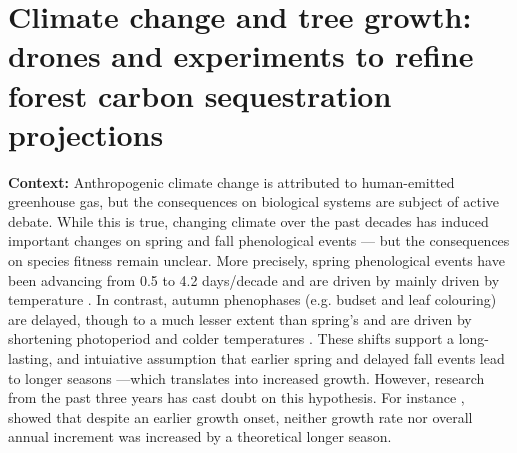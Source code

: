 \documentclass[12pt]{article}
\begin{document}

\section*{Climate change and tree growth: drones and experiments to refine forest carbon sequestration projections}



\textbf {Context:} Anthropogenic climate change is attributed to human-emitted greenhouse gas, but the consequences on biological systems are subject of active debate. While this is true, changing climate over the past decades has induced important changes on spring and fall phenological events --- but the consequences on species fitness remain unclear. More precisely, spring phenological events have been advancing from 0.5 \citep{wolfe_climate_2005} to 4.2 days/decade \citep{chmielewski_response_2001,fu_recent_2014} and are driven by mainly driven by temperature \citep{chuine_why_2010,cleland_shifting_2007,penuelas_responses_2001}. In contrast, autumn phenophases (e.g. budset and leaf colouring) are delayed, though to a much lesser extent than spring's \citep{gallinat_autumn_2015,jeong_macroscale_2014} and are driven by shortening photoperiod \citep{cooke_dynamic_2012,flynn_temperature_2018,korner_phenology_2010} and colder temperatures \citep{cooke_dynamic_2012,delpierre_temperate_2016}. These shifts support a long-lasting, and intuiative assumption that earlier spring and delayed fall events lead to longer seasons ---which translates into increased growth. However, research from the past three years has cast doubt on this hypothesis. For instance \citep{dow_warm_2022}, showed that despite an earlier growth onset, neither growth rate nor overall annual increment was increased by a theoretical longer season. 
\end{document}
